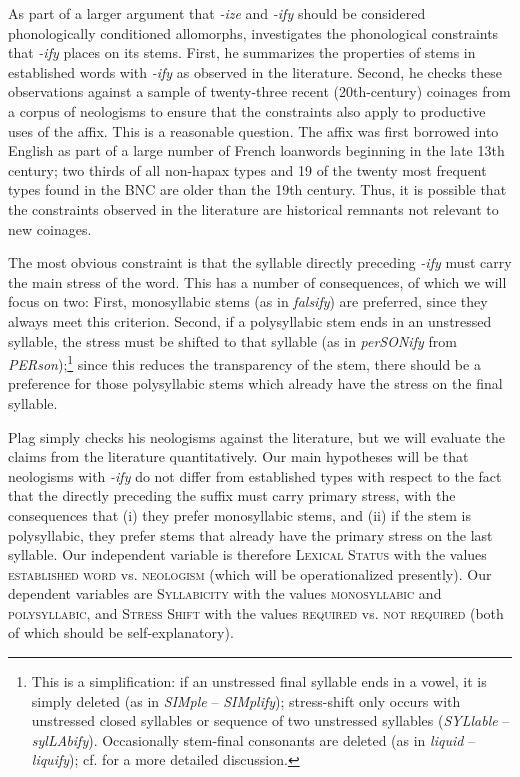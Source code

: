As part of a larger argument that \textit{-ize} and \textit{-ify} should be considered phonologically conditioned allomorphs, \citet{plag_morphological_1999} investigates the phonological constraints that \textit{-ify} places on its stems. First, he summarizes the properties of stems in established words with \textit{-ify} as observed in the literature. Second, he checks these observations against a sample of twenty-three recent (20th-century) coinages from a corpus of neologisms to ensure that the constraints also apply to productive uses of the affix. This is a reasonable question. The affix was first borrowed into English as part of a large number of French loanwords beginning in the late 13th century; two thirds of all non-hapax types and 19 of the twenty most frequent types found in the BNC are older than the 19th century. Thus, it is possible that the constraints observed in the literature are historical remnants not relevant to new coinages.

The most obvious constraint is that the syllable directly preceding \textit{-ify} must carry the main stress of the word. This has a number of consequences, of which we will focus on two: First, monosyllabic stems (as in \textit{falsify}) are preferred, since they always meet this criterion. Second, if a polysyllabic stem ends in an unstressed syllable, the stress must be shifted to that syllable (as in \textit{perSONify} from \textit{PERson});\footnote{This is a simplification: if an unstressed final syllable ends in a vowel, it is simply deleted (as in \textit{SIMple} -- \textit{SIMplify}); stress-shift only occurs with unstressed closed syllables or sequence of two unstressed syllables (\textit{SYLlable} -- \textit{sylLAbify}). Occasionally stem-final consonants are deleted (as in \textit{liquid} -- \textit{liquify}); cf. \citet{plag_morphological_1999} for a more detailed discussion.} since this reduces the transparency of the stem, there should be a preference for those polysyllabic stems which already have the stress on the final syllable.

Plag simply checks his neologisms against the literature, but we will evaluate the claims from the literature quantitatively. Our main hypotheses will be that neologisms with \textit{-ify} do not differ from established types with respect to the fact that the directly preceding the suffix must carry primary stress, with the consequences that (i) they prefer monosyllabic stems, and (ii) if the stem is polysyllabic, they prefer stems that already have the primary stress on the last syllable. Our independent variable is therefore \textsc{Lexical Status} with the values \textsc{established word} vs. \textsc{neologism} (which will be operationalized presently). Our dependent variables are \textsc{Syllabicity} with the values \textsc{monosyllabic} and \textsc{polysyllabic}, and \textsc{Stress Shift} with the values \textsc{required} vs. \textsc{not required} (both of which should be self-explanatory).

